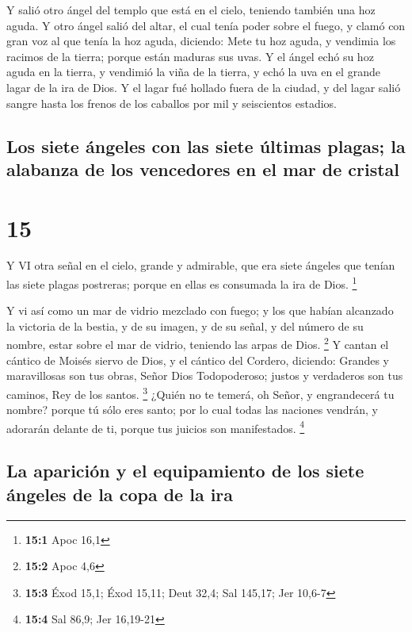  Y salió otro ángel del templo que está en el cielo,
teniendo también una hoz aguda.  Y otro ángel salió del
altar, el cual tenía poder sobre el fuego, y clamó con gran voz al que
tenía la hoz aguda, diciendo: Mete tu hoz aguda, y vendimia los racimos
de la tierra; porque están maduras sus uvas.  Y el ángel
echó su hoz aguda en la tierra, y vendimió la viña de la tierra, y echó
la uva en el grande lagar de la ira de Dios.  Y el lagar
fué hollado fuera de la ciudad, y del lagar salió sangre hasta los
frenos de los caballos por mil y seiscientos estadios.

\hypertarget{los-siete-uxe1ngeles-con-las-siete-uxfaltimas-plagas-la-alabanza-de-los-vencedores-en-el-mar-de-cristal}{%
\subsection{Los siete ángeles con las siete últimas plagas; la alabanza
de los vencedores en el mar de
cristal}\label{los-siete-uxe1ngeles-con-las-siete-uxfaltimas-plagas-la-alabanza-de-los-vencedores-en-el-mar-de-cristal}}

\hypertarget{section-14}{%
\section{15}\label{section-14}}

 Y VI otra señal en el cielo, grande y admirable, que era
siete ángeles que tenían las siete plagas postreras; porque en ellas es
consumada la ira de Dios. \footnote{\textbf{15:1} Apoc 16,1}

 Y vi así como un mar de vidrio mezclado con fuego; y los
que habían alcanzado la victoria de la bestia, y de su imagen, y de su
señal, y del número de su nombre, estar sobre el mar de vidrio, teniendo
las arpas de Dios. \footnote{\textbf{15:2} Apoc 4,6}  Y
cantan el cántico de Moisés siervo de Dios, y el cántico del Cordero,
diciendo: Grandes y maravillosas son tus obras, Señor Dios Todopoderoso;
justos y verdaderos son tus caminos, Rey de los santos. \footnote{\textbf{15:3}
  Éxod 15,1; Éxod 15,11; Deut 32,4; Sal 145,17; Jer 10,6-7} 
¿Quién no te temerá, oh Señor, y engrandecerá tu nombre? porque tú sólo
eres santo; por lo cual todas las naciones vendrán, y adorarán delante
de ti, porque tus juicios son manifestados. \footnote{\textbf{15:4} Sal
  86,9; Jer 16,19-21}

\hypertarget{la-apariciuxf3n-y-el-equipamiento-de-los-siete-uxe1ngeles-de-la-copa-de-la-ira}{%
\subsection{La aparición y el equipamiento de los siete ángeles de la
copa de la
ira}\label{la-apariciuxf3n-y-el-equipamiento-de-los-siete-uxe1ngeles-de-la-copa-de-la-ira}}

